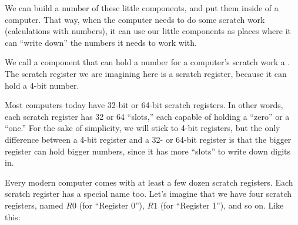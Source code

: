 \documentclass[../../../main.tex]{subfiles}
\begin{document}
We can build a number of these little components, and put them inside of a computer. That way, when the computer needs to do some scratch work (calculations with numbers), it can use our little components as places where it can ``write down'' the numbers it needs to work with.

We call a component that can hold a number for a computer's scratch work a . The scratch register we are imagining here is a  scratch register, because it can hold a 4-bit number. 

\begin{aside}
  \begin{remark}
    Most computers today have 32-bit or 64-bit scratch registers. In other words, each scratch register has 32 or 64 ``slots,'' each capable of holding a ``zero'' or a ``one.'' For the sake of simplicity, we will stick to 4-bit registers, but the only difference between a 4-bit register and a 32- or 64-bit register is that the bigger register can hold bigger numbers, since it has more ``slots'' to write down digits in. 
  \end{remark}
\end{aside}

Every modern computer comes with at least a few dozen scratch registers. Each scratch register has a special name too. Let's imagine that we have four scratch registers, named $R0$ (for ``Register 0''), $R1$ (for ``Register 1''), and so on. Like this:
\end{document}
